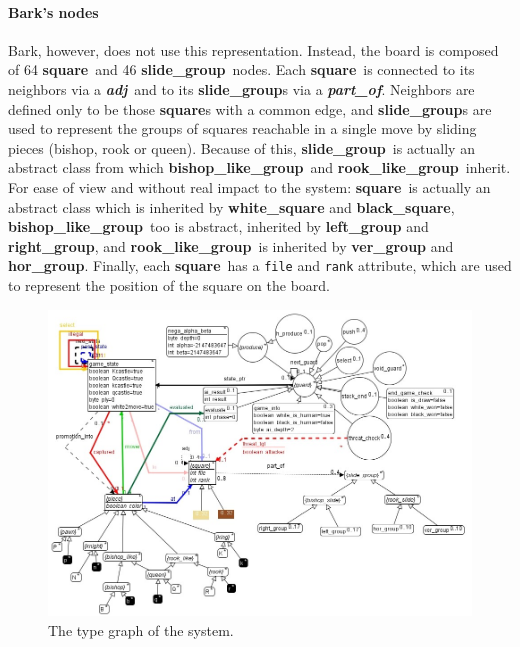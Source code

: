 \documentclass[a4paper]{scrartcl}
\newcommand{\noderepr}[1]{\textsf{\textbf{#1}}}
\newcommand{\edgerepr}[1]{\textit{\textbf{#1}}}
\newcommand{\squarenode}{\noderepr{square}}
\newcommand{\slidegroupnode}{\noderepr{slide\_group}}
\newcommand{\bishopgroupnode}{\noderepr{bishop\_like\_group}}
\newcommand{\rookgroupnode}{\noderepr{rook\_like\_group}}
\newcommand{\adj}{\edgerepr{adj}}
\newcommand{\partof}{\edgerepr{part\_of}}
\begin{document}
    \paragraph{Bark's nodes} Bark, however, does not use this representation. Instead, the board is composed of 64 \squarenode\ and 46 \slidegroupnode\  nodes. Each \squarenode\ is connected to its neighbors via a \adj\ and to its \slidegroupnode s via a \partof. Neighbors are defined only to be those \squarenode s with a common edge, and \slidegroupnode s are used to represent the groups of squares reachable in a single move by sliding pieces (bishop, rook or queen). Because of this, \slidegroupnode\ is actually an abstract class from which \bishopgroupnode\ and \rookgroupnode\ inherit.
    For ease of view and without real impact to the system: \squarenode\ is actually an abstract class which is inherited by \noderepr{white\_square} and \noderepr{black\_square}, \bishopgroupnode\ too is abstract, inherited by \noderepr{left\_group} and \noderepr{right\_group}, and \rookgroupnode\ is inherited by \noderepr{ver\_group} and \noderepr{hor\_group}.
    Finally, each \squarenode\ has a \texttt{file} and \texttt{rank} attribute, which are used to represent the position of the square on the board.
    \begin{figure}[H]
        \centering
        \includegraphics[width=.8\linewidth]{images/type_graph.jpg}
        \caption{The type graph of the system.}
    \end{figure}
\end{document}
